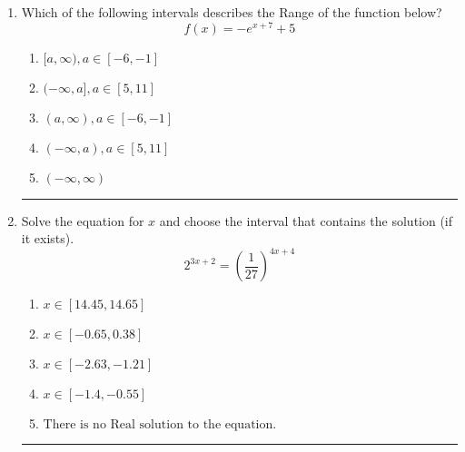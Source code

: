 \documentclass[14pt]{extbook}
\newcommand{\litem}[1]{\item#1\hspace*{-1cm}\rule{\textwidth}{0.4pt}}
\begin{document}
\begin{enumerate}
{\begin{enumerate}[label=\Alph*.]
\end{enumerate} }
\litem{
Which of the following intervals describes the Range of the function below?\[ f(x) = -e^{x+7}+5 \]\begin{enumerate}[label=\Alph*.]
\item \( [a, \infty), a \in [-6, -1] \)
\item \( (-\infty, a], a \in [5, 11] \)
\item \( (a, \infty), a \in [-6, -1] \)
\item \( (-\infty, a), a \in [5, 11] \)
\item \( (-\infty, \infty) \)

\end{enumerate} }
\litem{
Solve the equation for $x$ and choose the interval that contains the solution (if it exists).\[ 2^{3x+2} = \left(\frac{1}{27}\right)^{4x+4} \]\begin{enumerate}[label=\Alph*.]
\item \( x \in [14.45, 14.65] \)
\item \( x \in [-0.65, 0.38] \)
\item \( x \in [-2.63, -1.21] \)
\item \( x \in [-1.4, -0.55] \)
\item \( \text{There is no Real solution to the equation.} \)

\end{enumerate} }
\end{enumerate}
\end{document}
